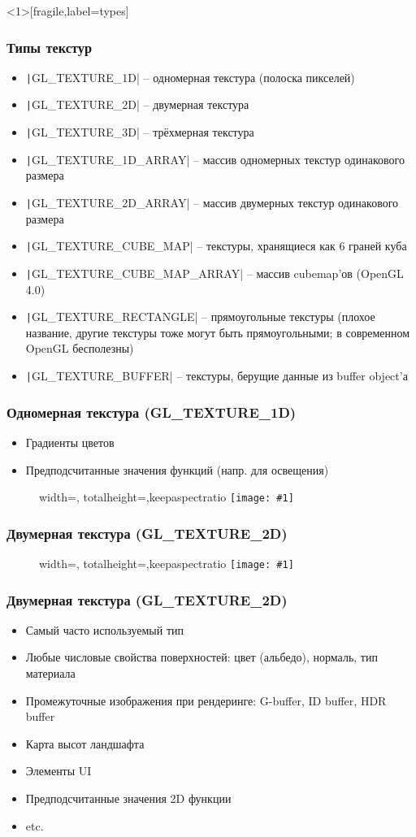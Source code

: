 \documentclass[10pt]{beamer}
\newcommand{\slideimage}[1]{
  \begin{figure}
    \begin{adjustbox}{width=\textwidth, totalheight=\textheight-2\baselineskip-2\baselineskip,keepaspectratio}
      \texttt{[image: \#1]}
    \end{adjustbox}
  \end{figure}
}
\begin{document}
\begin{frame}<1>[fragile,label=types]
\frametitle{Типы текстур}
\begin{itemize}
\item \texttt|GL_TEXTURE_1D| -- одномерная текстура (полоска пикселей)
\pause
\item \texttt|GL_TEXTURE_2D| -- двумерная текстура
\pause
\item \texttt|GL_TEXTURE_3D| -- трёхмерная текстура
\pause
\item \texttt|GL_TEXTURE_1D_ARRAY| -- массив одномерных текстур одинакового размера
\pause
\item \texttt|GL_TEXTURE_2D_ARRAY| -- массив двумерных текстур одинакового размера
\pause
\item \texttt|GL_TEXTURE_CUBE_MAP| -- текстуры, хранящиеся как 6 граней куба
\pause
\item \texttt|GL_TEXTURE_CUBE_MAP_ARRAY| -- массив cubemap'ов (OpenGL 4.0)
\pause
\item \texttt|GL_TEXTURE_RECTANGLE| -- прямоугольные текстуры \pause (плохое название, другие текстуры тоже могут быть прямоугольными; в современном OpenGL бесполезны)
\pause
\item \texttt|GL_TEXTURE_BUFFER| -- текстуры, берущие данные из buffer object'а
\end{itemize}
\end{frame}

\begin{frame}[fragile]
\frametitle{Одномерная текстура (GL\_TEXTURE\_1D)}
\begin{itemize}
\item Градиенты цветов
\item Предподсчитанные значения функций (напр. для освещения)
\end{itemize}
\slideimage{texture_1d.png}
\end{frame}


\begin{frame}[fragile]
\frametitle{Двумерная текстура (GL\_TEXTURE\_2D)}
\slideimage{texture_2d.jpg}
\end{frame}

\begin{frame}[fragile]
\frametitle{Двумерная текстура (GL\_TEXTURE\_2D)}
\begin{itemize}
\item Самый часто используемый тип
\item Любые числовые свойства поверхностей: цвет (альбедо), нормаль, тип материала
\item Промежуточные изображения при рендеринге: G-buffer, ID buffer, HDR buffer
\item Карта высот ландшафта
\item Элементы UI
\item Предподсчитанные значения 2D функции
\item etc.
\end{itemize}
\end{frame}
\end{document}
